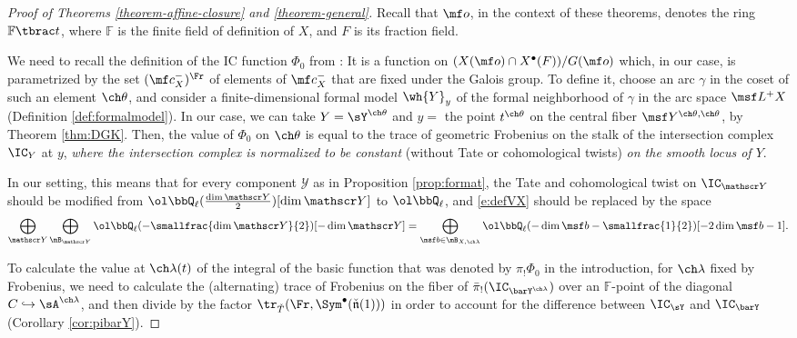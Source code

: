 \documentclass[final]{amsart}
\theoremstyle{remark}
\theoremstyle{definition}
\numberwithin{equation}{section}
\begin{document}
\begin{proof}[Proof of Theorems \ref{theorem-affine-closure} and \ref{theorem-general}]
Recall that $\mf o$, in the context of these theorems, denotes the ring $\mathbb F\tbrac t$, where $\mathbb F$ is the finite field of definition of $X$, and $F$ is its fraction field. 

We need to recall the definition of the IC function $\Phi_0$  from \cite{BNS}: It is a function on $(X(\mf o)\cap X^\bullet(F))/G(\mf o)$ which, in our case, is parametrized by the set $(\mf c_X^-)^{\Fr}$ of elements of $\mf c_X^-$ that are fixed under the Galois group. To define it, choose an arc $\gamma$ in the coset of such an element $\ch\theta$, and consider a finite-dimensional formal model $\wh{Y}_y$ of the formal neighborhood of $\gamma$ in the arc space $\msf L^+X$ (Definition \ref{def:formalmodel}).  
In our case, we can take $Y= \sY^{\ch\theta}$ and $y=$ the point $t^{\ch\theta}$ on the central fiber $\msf Y^{\ch\theta,\ch\theta}$, by Theorem \ref{thm:DGK}. Then, the value of $\Phi_0$ on $\ch\theta$ is equal to the trace of geometric Frobenius on the stalk of the intersection complex $\IC_Y$ at $y$, \emph{where the intersection complex is normalized to be constant} (without Tate or cohomological twists) \emph{on the smooth locus of $Y$}. 

In our setting, this means that for every component $\mathscr Y$ as in Proposition \ref{prop:format}, the Tate and cohomological twist on $\IC_{\mathscr Y}$ should be modified from $\ol\bbQ_\ell(\frac{\dim\mathscr Y}{2})[\dim \mathscr Y]$ to $\ol\bbQ_\ell$, and \eqref{e:defVX} should be replaced by the space 
\begin{equation}\label{e:defVX2}
\bigoplus_{\mathscr Y} \bigoplus_{\mB_{\mathscr Y}} \ol\bbQ_\ell(-\smallfrac{\dim\mathscr Y}{2})[-\dim \mathscr Y] = \bigoplus_{\msf b\in \mB_{X,\ch\lambda}} \ol\bbQ_\ell(-\dim \msf b - \smallfrac{1}{2})[-2\dim \msf b - 1].
\end{equation}


To calculate the value at $\ch\lambda(t)$ of the integral of the basic function that was denoted by $\pi_! \Phi_0$ in the introduction, for $\ch\lambda$ fixed by Frobenius, we need to calculate the (alternating) trace of Frobenius on the fiber of $ \bar\pi_!(\IC_{\barY^{\ch\lambda}})$ over an $\mathbb F$-point of the diagonal $C\hookrightarrow \sA^{\ch\lambda}$, and then divide by the factor $\tr_{\check T}(\Fr, \Sym^\bullet (\check{\mathfrak n}(1)))$ in order to account for the difference between $\IC_{\sY}$ and $\IC_{\barY}$ (Corollary \ref{cor:pibarY}).


\end{proof}
\end{document}
